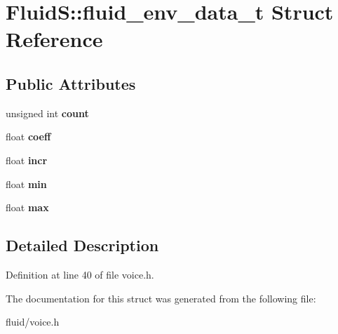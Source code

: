 \hypertarget{struct_fluid_s_1_1fluid__env__data__t}{}\section{FluidS\+:\+:fluid\+\_\+env\+\_\+data\+\_\+t Struct Reference}
\label{struct_fluid_s_1_1fluid__env__data__t}
\subsection*{Public Attributes}
\begin{DoxyCompactItemize}
\item 
\mbox{\label{struct_fluid_s_1_1fluid__env__data__t_adc7d597b2b22899ebd91850fc2c72bd8}} 
unsigned int {\bfseries count}
\item 
\mbox{\label{struct_fluid_s_1_1fluid__env__data__t_a74ca2771c4d4ae349ee3e9b42f8ec860}} 
float {\bfseries coeff}
\item 
\mbox{\label{struct_fluid_s_1_1fluid__env__data__t_a3bb17631b4b086226fb8929b652c615f}} 
float {\bfseries incr}
\item 
\mbox{\label{struct_fluid_s_1_1fluid__env__data__t_a1eb3f1f7507182480428c5bc96a97a29}} 
float {\bfseries min}
\item 
\mbox{\label{struct_fluid_s_1_1fluid__env__data__t_ae8f4bf4f0500d1310f041c0905b518da}} 
float {\bfseries max}
\end{DoxyCompactItemize}


\subsection{Detailed Description}


Definition at line 40 of file voice.\+h.



The documentation for this struct was generated from the following file\+:\begin{DoxyCompactItemize}
\item 
fluid/voice.\+h\end{DoxyCompactItemize}
